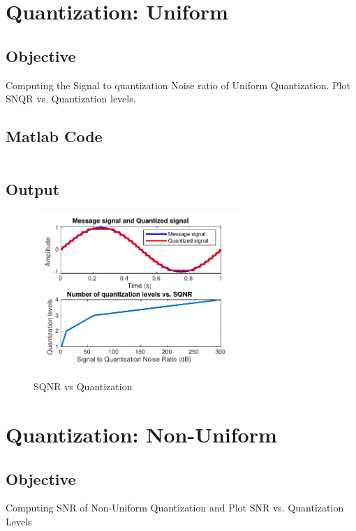 \section{Quantization: Uniform}
\label{sec:Quantization: Uniform}

\subsection{Objective}
Computing the Signal to quantization Noise ratio of Uniform Quantization. 
Plot SNQR vs. Quantization levels.

\subsection{Matlab Code}

\inputminted[fontsize=\footnotesize,autogobble]{matlab}{code/sqnr.m}

\subsection{Output}

\begin{figure}[!htb]
	\centering
	\includegraphics[width=0.70\textwidth]{res/figures/Figure_6.pdf}
	\label{output:SQNR vs quantization}
	\caption{SQNR vs Quantization}
\end{figure}

\section{Quantization: Non-Uniform}
\label{sec:Quantization: Non-Uniform}

\subsection{Objective}
Computing SNR of Non-Uniform Quantization and Plot SNR vs. Quantization Levels


